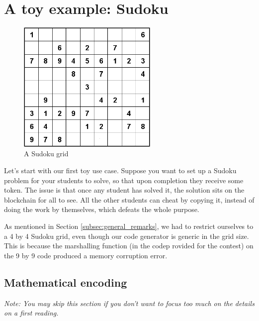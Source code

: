 \documentclass[10pt,a4paper]{article}
\begin{document}
\section{A toy example: Sudoku}
\label{section_sudoku}

	\begin{figure}[!h]
	\centering
	\includegraphics[width=0.6\textwidth]{Sudoku04}
	\caption{A Sudoku grid}
	\end{figure}


Let's start with our first toy use case. Suppose you want to set up a Sudoku problem for your students to solve, so that upon completion they receive some token. The issue is that once any student has solved it, the solution sits on the blockchain for all to see. All the other students can cheat by copying it, instead of doing the work by themselves, which defeats the whole purpose.

As mentioned in Section \ref{subsec:general_remarks}, we had to
restrict ourselves to a 4 by 4 Sudoku grid, even though our code
generator is generic in the grid size. This is because the marshalling
function (in the codep rovided for the contest) on the 9 by 9 code
produced a memory corruption error.

\subsection{Mathematical encoding}
\label{subsec:math_enc}

\emph{Note: You may skip this section if you don't want to focus too much on the details on a first reading.}
\end{document}
